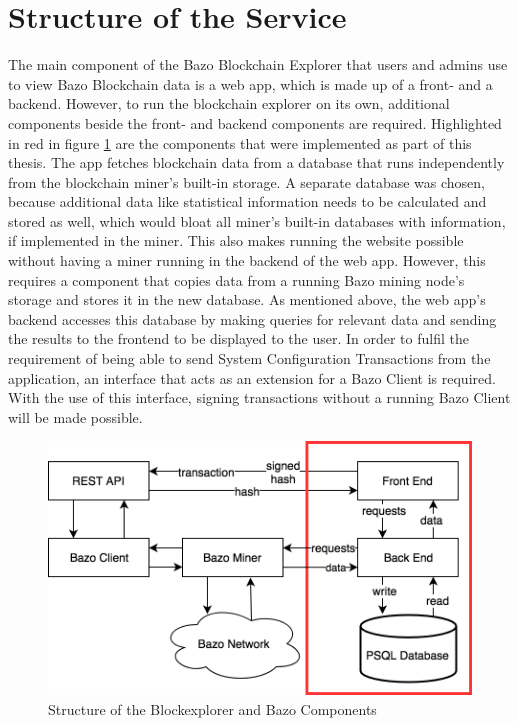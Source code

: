 \section{Structure of the Service}
The main component of the Bazo Blockchain Explorer that users and admins use to view Bazo Blockchain data is a web app, which is made up of a front- and a backend. However, to run the blockchain explorer on its own, additional components beside the front- and backend components are required. Highlighted in red in figure \ref{fig:structure} are the components that were implemented as part of this thesis. The app fetches blockchain data from a database that runs independently from the blockchain miner's built-in storage. A separate database was chosen, because additional data like statistical information needs to be calculated and stored as well, which would bloat all miner's built-in databases with information, if implemented in the miner. This also makes running the website possible without having a miner running in the backend of the web app. However, this requires a component that copies data from a running Bazo mining node's storage and stores it in the new database. As mentioned above, the web app's backend accesses this database by making queries for relevant data and sending the results to the frontend to be displayed to the user. In order to fulfil the requirement of being able to send System Configuration Transactions from the application, an interface that acts as an extension for a Bazo Client is required. With the use of this interface, signing transactions without a running Bazo Client will be made possible.

\begin{figure}
  \includegraphics[scale=0.4]{system.png}
  \centering
  \caption{Structure of the Blockexplorer and Bazo Components}
  \label{fig:structure}
\end{figure}

